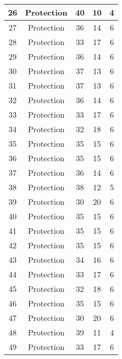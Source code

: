 \documentclass[results.tex]{subfiles}
\begin{document}
\begin{center}
\begin{tabular}{| c || c | c | c | c |}
    \hline
    26 & Protection & 40 & 10 & 4 \\ 
    \hline
    27 & Protection & 36 & 14 & 6 \\ 
    \hline
    28 & Protection & 33 & 17 & 6 \\ 
    \hline
    29 & Protection & 36 & 14 & 6 \\ 
    \hline
    30 & Protection & 37 & 13 & 6 \\ 
    \hline
    31 & Protection & 37 & 13 & 6 \\ 
    \hline
    32 & Protection & 36 & 14 & 6 \\ 
    \hline
    33 & Protection & 33 & 17 & 6 \\ 
    \hline
    34 & Protection & 32 & 18 & 6 \\ 
    \hline
    35 & Protection & 35 & 15 & 6 \\ 
    \hline
    36 & Protection & 35 & 15 & 6 \\ 
    \hline
    37 & Protection & 36 & 14 & 6 \\ 
    \hline
    38 & Protection & 38 & 12 & 5 \\ 
    \hline
    39 & Protection & 30 & 20 & 6 \\ 
    \hline
    40 & Protection & 35 & 15 & 6 \\ 
    \hline
    41 & Protection & 35 & 15 & 6 \\ 
    \hline
    42 & Protection & 35 & 15 & 6 \\ 
    \hline
    43 & Protection & 34 & 16 & 6 \\ 
    \hline
    44 & Protection & 33 & 17 & 6 \\ 
    \hline
    45 & Protection & 32 & 18 & 6 \\ 
    \hline
    46 & Protection & 35 & 15 & 6 \\ 
    \hline
    47 & Protection & 30 & 20 & 6 \\ 
    \hline
    48 & Protection & 39 & 11 & 4 \\ 
    \hline
    49 & Protection & 33 & 17 & 6 \\ 
    \hline   \end{tabular}
\end{center}
\end{document}
